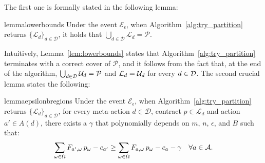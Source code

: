 %
The first one is formally stated in the following lemma:
%
\begin{restatable}{lemma}{lowerbounds}\label{lem:lowerbounds}
	Under the event $\mathcal{E}_\epsilon$, when Algorithm~\ref{alg:try_partition} returns $\{\mathcal{L}_{d}\}_{d\in  \mathcal{D} }$, it holds that $\bigcup_{d \in \mathcal{D}} \mathcal{L}_d ={\mathcal{P}}$.
\end{restatable}
%
Intuitively, Lemma~\ref{lem:lowerbounds} states that Algorithm~\ref{alg:try_partition} terminates with a correct cover of $\mathcal{P}$, and it follows from the fact that, at the end of the algorithm, $\bigcup_{d \in \mathcal{D}} \mathcal{U}_{d} = \mathcal{P}$ and $\mathcal{L}_d=\mathcal{U}_d$ for every $d \in \mathcal{D}$.
%
The second crucial lemma states the following:
%
%
\begin{restatable}{lemma}{epsilonbregions}\label{lem:epsilonbr}
	Under the event $\mathcal{E}_\epsilon$, when Algorithm~\ref{alg:try_partition} returns $\{\mathcal{L}_{d}\}_{d\in  \mathcal{D} }$, for every meta-action $d \in \mathcal{D}$, contract $p \in \mathcal{L}_{d}$ and action $a' \in A(d)$, there exists a $\gamma$ that polynomially depends on $m$, $n$, $\epsilon$, and $B$ such that:
	\begin{equation*}
	\sum_{\omega \in \Omega } {F}_{a', \omega} \, p_{\omega} - c_{a'} \ge
	\sum_{\omega \in \Omega } F_{a, \omega} \, p_{\omega}- c_{a} - \gamma \quad \forall a \in \mathcal{A}.
	\vspace{-3mm}
	\end{equation*}
%	
\end{restatable}
%
